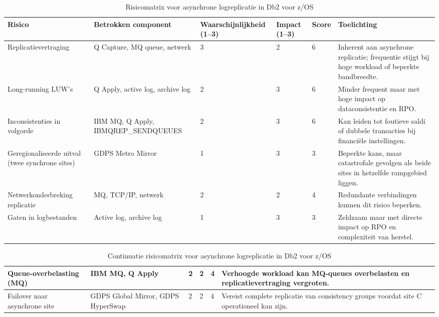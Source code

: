 \begin{table}[htbp]
\centering
\begin{tabularx}{\textwidth}{|p{3.5cm}|p{2.5cm}|p{1.5cm}|p{1.5cm}|p{1cm}|>{\raggedright\arraybackslash}X|}
\hline
\textbf{Risico} & \textbf{Betrokken component} & \textbf{Waar\-schijn\-lijk\-heid (1--3)} & \textbf{Impact (1--3)} & \textbf{Score} & \textbf{Toelichting} \\
\hline
Replicatie\-vertraging & Q Capture, MQ queue, netwerk & 3 & 2 & 6 & Inherent aan asynchrone replicatie; frequentie stijgt bij hoge workload of beperkte bandbreedte. \\
\hline
Long-running LUW's & Q Apply, active log, archive log & 2 & 3 & 6 & Minder frequent maar met hoge impact op dataconsistentie en RPO. \\
\hline
Inconsistenties in volgorde & IBM MQ, Q Apply, IBMQREP\_SEND\-QUEUES & 2 & 3 & 6 & Kan leiden tot foutieve saldi of dubbele transacties bij financiële instellingen. \\
\hline
Geregionaliseerde uitval (twee synchrone sites) & GDPS Metro Mirror & 1 & 3 & 3 & Beperkte kans, maar catastrofale gevolgen als beide sites in hetzelfde rampgebied liggen. \\
\hline
Netwerk\-onderbreking replicatie & MQ, TCP/IP, netwerk & 2 & 2 & 4 & Redundante verbindingen kunnen dit risico beperken. \\
\hline
Gaten in logbestanden & Active log, archive log & 1 & 3 & 3 & Zeldzaam maar met directe impact op RPO en complexiteit van herstel. \\
\hline
\end{tabularx}
\caption{Risicomatrix voor asynchrone logreplicatie in Db2 voor z/OS}
\label{tab:risicomatrix}
\end{table}

\begin{table}[htbp]
\begin{tabularx}{\textwidth}{|p{3.5cm}|p{2.5cm}|p{1.5cm}|p{1.5cm}|p{1cm}|>{\raggedright\arraybackslash}X|}
\hline
Queue-overbelasting (MQ) & IBM MQ, Q Apply & 2 & 2 & 4 & Verhoogde workload kan MQ-queues overbelasten en replicatievertraging vergroten. \\
\hline
Failover naar asynchrone site & GDPS Global Mirror, GDPS HyperSwap & 2 & 2 & 4 & Vereist complete replicatie van consistency groups voordat site C operationeel kan zijn. \\
\hline
\end{tabularx}
\caption{Continuatie risicomatrix voor asynchrone logreplicatie in Db2 voor z/OS}
\label{tab:risicomatrix2}
\end{table}


